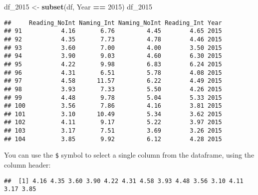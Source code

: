 \documentclass[]{article}
\newenvironment{Shaded}{\begin{snugshade}}{\end{snugshade}}
\newcommand{\KeywordTok}[1]{\textcolor[rgb]{0.13,0.29,0.53}{\textbf{#1}}}
\newcommand{\DecValTok}[1]{\textcolor[rgb]{0.00,0.00,0.81}{#1}}
\newcommand{\StringTok}[1]{\textcolor[rgb]{0.31,0.60,0.02}{#1}}
\newcommand{\OperatorTok}[1]{\textcolor[rgb]{0.81,0.36,0.00}{\textbf{#1}}}
\newcommand{\NormalTok}[1]{#1}
\begin{document}
\begin{Shaded}
\begin{Highlighting}[]
\NormalTok{df_}\DecValTok{2015}\NormalTok{ <-}\StringTok{ }\KeywordTok{subset}\NormalTok{(df, Year }\OperatorTok{==}\StringTok{ }\DecValTok{2015}\NormalTok{)}
\NormalTok{df_}\DecValTok{2015}
\end{Highlighting}
\end{Shaded}

\begin{verbatim}
##     Reading_NoInt Naming_Int Naming_NoInt Reading_Int Year
## 91           4.16       6.76         4.45        4.65 2015
## 92           4.35       7.73         4.78        4.46 2015
## 93           3.60       7.00         4.00        3.50 2015
## 94           3.90       9.03         4.60        6.30 2015
## 95           4.22       9.98         6.83        6.24 2015
## 96           4.31       6.51         5.78        4.08 2015
## 97           4.58      11.57         6.22        4.49 2015
## 98           3.93       7.33         5.50        4.26 2015
## 99           4.48       9.78         5.04        5.33 2015
## 100          3.56       7.86         4.16        3.81 2015
## 101          3.10      10.49         5.34        3.62 2015
## 102          4.11       9.17         5.22        3.97 2015
## 103          3.17       7.51         3.69        3.26 2015
## 104          3.85       9.92         6.12        4.28 2015
\end{verbatim}

You can use the \texttt{\$} symbol to select a single column from the
dataframe, using the column header:

\begin{Shaded}
\end{Shaded}

\begin{verbatim}
##  [1] 4.16 4.35 3.60 3.90 4.22 4.31 4.58 3.93 4.48 3.56 3.10 4.11 3.17 3.85
\end{verbatim}


\end{document}
